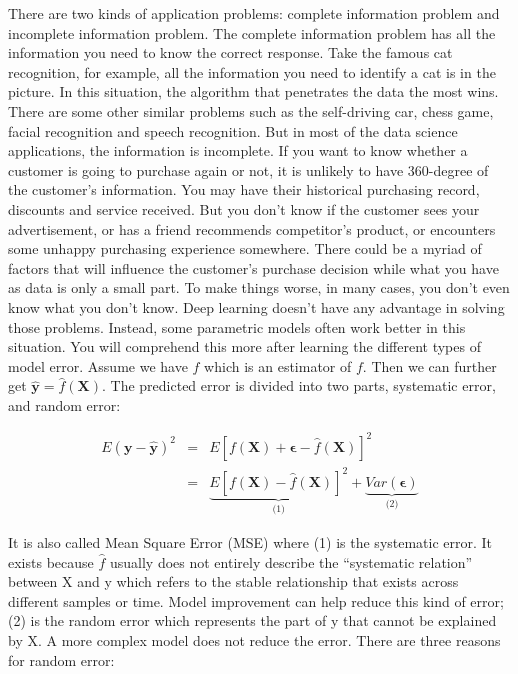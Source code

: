 \documentclass[12pt,]{krantz}
\begin{document}
There are two kinds of application problems: complete information problem and incomplete information problem. The complete information problem has all the information you need to know the correct response. Take the famous cat recognition, for example, all the information you need to identify a cat is in the picture. In this situation, the algorithm that penetrates the data the most wins. There are some other similar problems such as the self-driving car, chess game, facial recognition and speech recognition. But in most of the data science applications, the information is incomplete. If you want to know whether a customer is going to purchase again or not, it is unlikely to have 360-degree of the customer's information. You may have their historical purchasing record, discounts and service received. But you don't know if the customer sees your advertisement, or has a friend recommends competitor's product, or encounters some unhappy purchasing experience somewhere. There could be a myriad of factors that will influence the customer's purchase decision while what you have as data is only a small part. To make things worse, in many cases, you don't even know what you don't know. Deep learning doesn't have any advantage in solving those problems. Instead, some parametric models often work better in this situation. You will comprehend this more after learning the different types of model error.
Assume we have \(\hat{f}\) which is an estimator of \(f\). Then we can further get \(\symbf{\hat{y}}=\hat{f}(\mathbf{X})\). The predicted error is divided into two parts, systematic error, and random error:

\begin{equation}
\begin{array}{ccc}
E(\mathbf{y}-\hat{\mathbf{y}})^{2} & = & E[f(\mathbf{X})+ \symbf{\epsilon} - \hat{f}(\mathbf{X})]^{2}\\
 & = & \underset{\text{(1)}}{\underbrace{E[f(\mathbf{X})-\hat{f}(\mathbf{X})]^{2}}}+\underset{\text{(2)}}{\underbrace{Var(\symbf{\epsilon})}}
\end{array}
\label{eq:error}
\end{equation}

It is also called Mean Square Error (MSE) where (1) is the systematic error. It exists because \(\hat{f}\) usually does not entirely describe the ``systematic relation'' between X and y which refers to the stable relationship that exists across different samples or time. Model improvement can help reduce this kind of error; (2) is the random error which represents the part of y that cannot be explained by X. A more complex model does not reduce the error. There are three reasons for random error:
\end{document}
